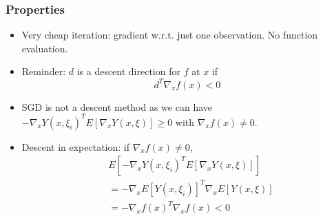 \documentclass{beamer}
\begin{document}
\begin{frame}
\frametitle{Properties}

\begin{itemize}
\item 
Very cheap iteration: gradient w.r.t. just one observation. No function evaluation.
\item
Reminder: $d$ is a descent direction for $f$ at $x$ if
$$
d^T \nabla_x f(x) < 0
$$
\item
SGD is not a descent method as we can have $-\nabla_x Y(x,\xi_i)^T E[\nabla_x Y(x,\xi)] \geq 0$ with $\nabla_x f(x) \ne 0$.
\item
Descent in expectation: if $\nabla_x f(x) \ne 0$,
\begin{align*}
& E[-\nabla_x Y(x,\xi_i)^T E[\nabla_x Y(x,\xi)]] \\
&= - \nabla_x E[Y(x,\xi_i)]^T \nabla_x E[Y(x,\xi)] \\
&= - \nabla_x f(x)^T\nabla_x f(x) < 0
\end{align*}
\end{itemize}



\end{frame}
\end{document}
